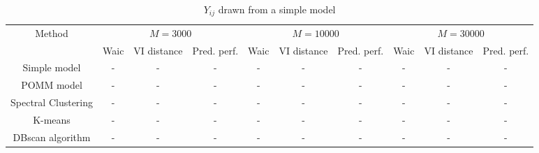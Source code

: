 \documentclass[11pt]{amsart}
\begin{document}
\begin{landscape}
\begin{table}[htbp]
\centering
\caption{$Y_{ij}$ drawn from a simple model}
\begin{tabular}{cccccccccc}
\toprule
\multirow{2}{*}{Method} & \multicolumn{3}{c}{$M=3000$} & \multicolumn{3}{c}{$M=10000$} & \multicolumn{3}{c}{$M=30000$} \\
\cmidrule(lr){2-4} \cmidrule(lr){5-7} \cmidrule(lr){8-10}
& Waic & VI distance & Pred. perf. & Waic & VI distance & Pred. perf. & Waic & VI distance & Pred. perf. \\
\midrule
Simple model & - & - & - & - & - & - & - & - & - \\
POMM model & - & - & - & - & - & - & - & - & - \\
Spectral Clustering & - & - & - & - & - & - & - & - & - \\
K-means & - & - & - & - & - & - & - & - & - \\
DBscan algorithm & - & - & - & - & - & - & - & - & - \\
\bottomrule
\end{tabular}
\end{table}
\end{landscape}
\end{document}

